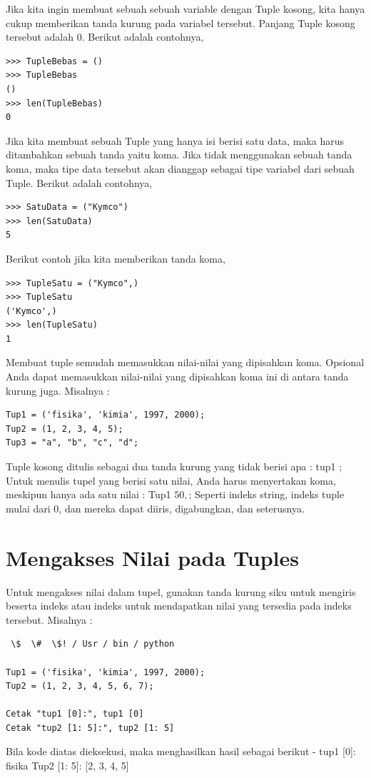 Jika kita ingin membuat sebuah sebuah variable dengan Tuple kosong, kita hanya cukup memberikan tanda kurung pada variabel tersebut. Panjang Tuple kosong tersebut adalah 0. 
Berikut adalah contohnya, 
\begin{verbatim}
>>> TupleBebas = () 
>>> TupleBebas 
() 
>>> len(TupleBebas) 
0 
\end{verbatim}
Jika kita membuat sebuah Tuple yang hanya isi berisi satu data, maka harus ditambahkan sebuah tanda yaitu koma. Jika tidak menggunakan sebuah tanda koma, maka tipe data tersebut akan dianggap sebagai tipe variabel dari sebuah Tuple. Berikut adalah contohnya, 
\begin{verbatim}
>>> SatuData = ("Kymco") 
>>> len(SatuData) 
5 
\end{verbatim}
 Berikut contoh jika kita memberikan tanda koma, 
\begin{verbatim}
>>> TupleSatu = ("Kymco",) 
>>> TupleSatu 
('Kymco',) 
>>> len(TupleSatu) 
1 
\end{verbatim}
Membuat tuple semudah memasukkan nilai-nilai yang dipisahkan koma. Opsional Anda dapat memasukkan nilai-nilai yang dipisahkan koma ini di antara tanda kurung juga. Misalnya : 
\begin{verbatim}
Tup1 = ('fisika', 'kimia', 1997, 2000); 
Tup2 = (1, 2, 3, 4, 5); 
Tup3 = "a", "b", "c", "d"; 
\end{verbatim}
Tuple kosong ditulis sebagai dua tanda kurung yang tidak berisi apa : 
tup1 \= \(\); 
Untuk menulis tupel yang berisi satu nilai, Anda harus menyertakan koma, meskipun hanya ada satu nilai : 
Tup1 \= \(50,\); 
Seperti indeks string, indeks tuple mulai dari 0, dan mereka dapat diiris, digabungkan, dan seterusnya. 
\section{Mengakses Nilai pada Tuples} 
Untuk mengakses nilai dalam tupel, gunakan tanda kurung siku untuk mengiris beserta indeks atau indeks untuk mendapatkan nilai yang tersedia pada indeks tersebut. Misalnya : 
\begin{verbatim}
 \$  \#  \$! / Usr / bin / python 

Tup1 = ('fisika', 'kimia', 1997, 2000); 
Tup2 = (1, 2, 3, 4, 5, 6, 7); 

Cetak "tup1 [0]:", tup1 [0] 
Cetak "tup2 [1: 5]:", tup2 [1: 5] 
\end{verbatim}
Bila kode diatas dieksekusi, maka menghasilkan hasil sebagai berikut - 
tup1 [0]: fisika 
Tup2 [1: 5]: [2, 3, 4, 5] 
